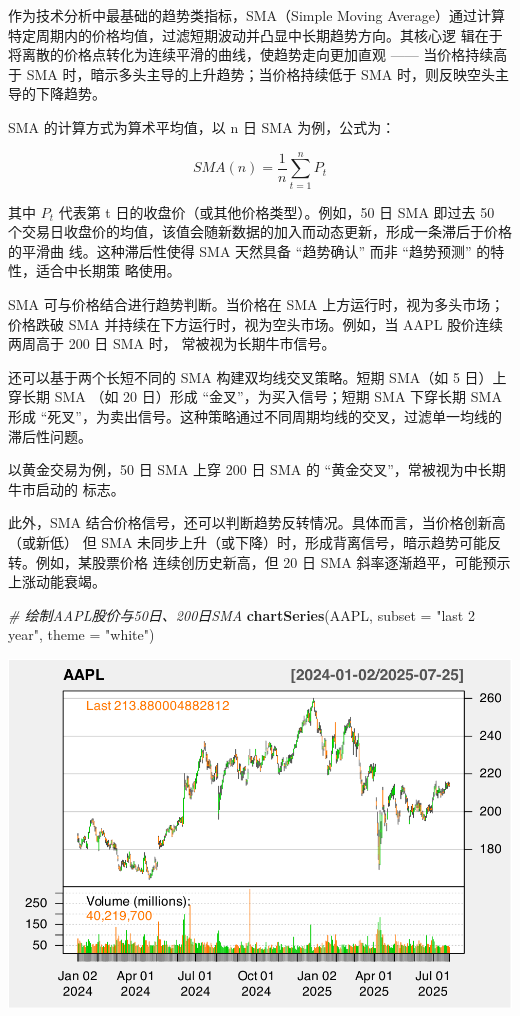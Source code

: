 \documentclass[]{ctexbook}
\newenvironment{Shaded}{\begin{snugshade}}{\end{snugshade}}
\newcommand{\AttributeTok}[1]{\textcolor[rgb]{0.13,0.29,0.53}{#1}}
\newcommand{\CommentTok}[1]{\textcolor[rgb]{0.56,0.35,0.01}{\textit{#1}}}
\newcommand{\FunctionTok}[1]{\textcolor[rgb]{0.13,0.29,0.53}{\textbf{#1}}}
\newcommand{\NormalTok}[1]{#1}
\newcommand{\StringTok}[1]{\textcolor[rgb]{0.31,0.60,0.02}{#1}}
\begin{document}
作为技术分析中最基础的趋势类指标，SMA（Simple Moving Average）通过计算特定周期内的价格均值，过滤短期波动并凸显中长期趋势方向。其核心逻
辑在于将离散的价格点转化为连续平滑的曲线，使趋势走向更加直观 ------ 当价格持续高于 SMA 时，暗示多头主导的上升趋势；当价格持续低于 SMA 时，则反映空头主导的下降趋势。

SMA 的计算方式为算术平均值，以 n 日 SMA 为例，公式为：

\[
SMA(n) = \frac{1}{n}\sum_{t=1}^nP_t
\]

其中 \(P_t\) 代表第 t 日的收盘价（或其他价格类型）。例如，50 日 SMA 即过去 50 个交易日收盘价的均值，该值会随新数据的加入而动态更新，形成一条滞后于价格的平滑曲
线。这种滞后性使得 SMA 天然具备 ``趋势确认'' 而非 ``趋势预测'' 的特性，适合中长期策
略使用。

SMA 可与价格结合进行趋势判断。当价格在 SMA 上方运行时，视为多头市场；价格跌破 SMA 并持续在下方运行时，视为空头市场。例如，当 AAPL 股价连续两周高于 200 日 SMA 时，
常被视为长期牛市信号。

还可以基于两个长短不同的 SMA 构建双均线交叉策略。短期 SMA（如 5 日）上穿长期 SMA
（如 20 日）形成 ``金叉''，为买入信号；短期 SMA 下穿长期 SMA 形成 ``死叉''，为卖出信号。这种策略通过不同周期均线的交叉，过滤单一均线的滞后性问题。

以黄金交易为例，50 日 SMA 上穿 200 日 SMA 的 ``黄金交叉''，常被视为中长期牛市启动的
标志。

此外，SMA 结合价格信号，还可以判断趋势反转情况。具体而言，当价格创新高（或新低）
但 SMA 未同步上升（或下降）时，形成背离信号，暗示趋势可能反转。例如，某股票价格
连续创历史新高，但 20 日 SMA 斜率逐渐趋平，可能预示上涨动能衰竭。

\begin{Shaded}
\begin{Highlighting}[]
\CommentTok{\# 绘制AAPL股价与50日、200日SMA}
\FunctionTok{chartSeries}\NormalTok{(AAPL, }\AttributeTok{subset =} \StringTok{"last 2 year"}\NormalTok{, }\AttributeTok{theme =} \StringTok{"white"}\NormalTok{)}
\end{Highlighting}
\end{Shaded}

\includegraphics[width=0.9\linewidth]{QuantmodHandbook_files/figure-latex/sma-1}
\end{document}

